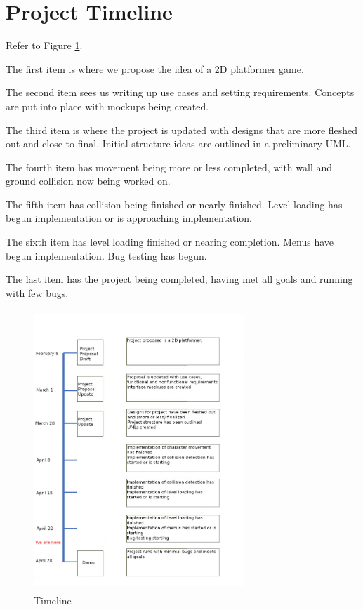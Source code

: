 \documentclass[10pt,conference,onecolumn,compsoc]{IEEEtran}
\begin{document}
\section{Project Timeline}
Refer to Figure \ref{Timeline}.

The first item is where we propose the idea of a 2D platformer game.

The second item sees us writing up use cases and setting requirements. Concepts are put into place with mockups being created.

The third item is where the project is updated with designs that are more fleshed out and close to final. Initial structure ideas are outlined in a preliminary UML.

The fourth item has movement being more or less completed, with wall and ground collision now being worked on.

The fifth item has collision being finished or nearly finished. Level loading has begun implementation or is approaching implementation.

The sixth item has level loading finished or nearing completion. Menus have begun implementation. Bug testing has begun.

The last item has the project being completed, having met all goals and running with few bugs.
\begin{figure}[ht!]
\includegraphics[height=400px, width=300px]{Timeline.jpg}
\caption{Timeline}
\label{Timeline}
\end{figure}
\end{document}
